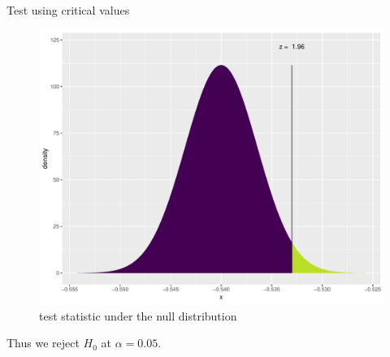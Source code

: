 \documentclass{beamer}\usepackage[]{graphicx}\usepackage[]{color}
\newenvironment{knitrout}{}{} %
\begin{document}
\begin{frame}[fragile]{Test using critical values}
\begin{minipage}{0.47\textwidth}
\begin{knitrout}
\begin{figure}
{\centering \includegraphics[width=1\linewidth]{figure/unnamed-chunk-5-1} 

}

\caption[test statistic under the null distribution]{test statistic under the null distribution}\label{fig:unnamed-chunk-5}
\end{figure}


\end{knitrout}
\end{minipage}	
	
Thus we reject $H_0$ at $\alpha = 0.05$.
\end{frame}
\end{document}
